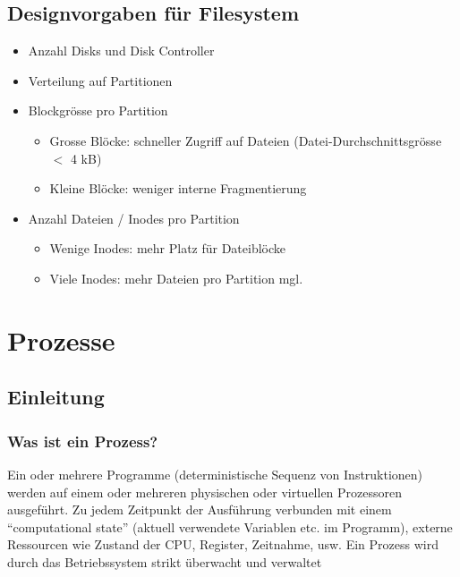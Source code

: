 \documentclass[a4paper, 10pt]{article}
\begin{document}
\subsection{Designvorgaben für Filesystem}
\begin{itemize}
\item Anzahl Disks und Disk Controller
\item Verteilung auf Partitionen
\item Blockgrösse pro Partition
\begin{itemize}
\item Grosse Blöcke: schneller Zugriff auf Dateien (Datei-Durchschnittsgrösse $<$ 4 kB)
\item Kleine Blöcke: weniger interne Fragmentierung
\end{itemize}
\item Anzahl Dateien / Inodes pro Partition
\begin{itemize}
\item Wenige Inodes: mehr Platz für Dateiblöcke
\item Viele Inodes: mehr Dateien pro Partition mgl.
\end{itemize}
\end{itemize}

\newpage
\section{Prozesse}

\subsection{Einleitung}

\subsubsection{Was ist ein Prozess?}
Ein oder mehrere Programme (deterministische Sequenz von Instruktionen) werden auf einem oder mehreren physischen oder virtuellen Prozessoren ausgeführt. Zu jedem Zeitpunkt der Ausführung verbunden mit einem “computational state” (aktuell verwendete Variablen etc. im Programm), externe Ressourcen wie Zustand der CPU, Register, Zeitnahme, usw. Ein Prozess wird durch das Betriebssystem strikt überwacht und verwaltet
\end{document}
